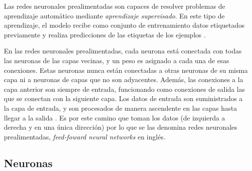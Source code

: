 \vspace{10pt}
Las redes neuronales prealimentadas son capaces de 
resolver problemas de aprendizaje automático mediante \textit{aprendizaje supervisado}. En este tipo de aprendizaje, el 
modelo recibe como conjunto de entrenamiento datos etiquetados previamente y realiza predicciones de las etiquetas de 
los ejemplos \cite{mohri_rostamizadeh_talwalkar_2018}.

\vspace{10pt}
En las redes neuronales prealimentadas, cada neurona está conectada con todas las neuronas de las capas vecinas, y un 
peso es asignado a cada una de esas conexiones. Estas neuronas nunca están conectadas a otras neuronas de su misma capa
ni a neuronas de capas que no son adyacentes. Además, las conexiones a la capa anterior son siempre de entrada, funcionando como conexiones de salida las que se conectan con la siguiente capa. Los datos de entrada son suministrados 
a la capa de entrada, y son procesados de manera ascendente en las capas hasta llegar a la salida \cite{Yagawa2021}. Es 
por este camino que toman los datos (de izquierda a derecha y en una única dirección) por lo que se las denomina redes 
neuronales prealimentadas, \textit{feed-foward neural networks} en inglés. 

\subsection{Neuronas}

